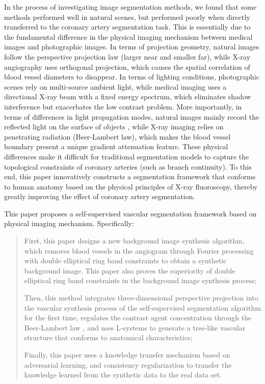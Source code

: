 
In the process of investigating image segmentation methods, we found that some methods \cite{FC.19.IIC}\cite{FC.9.ReDO} performed well in natural scenes, but performed poorly when directly transferred to the coronary artery segmentation task. This is essentially due to the fundamental difference in the physical imaging mechanism between medical images and photographic images. In terms of projection geometry, natural images follow the perspective projection law (larger near and smaller far), while X-ray angiography uses orthogonal projection, which causes the spatial correlation of blood vessel diameters to disappear. In terms of lighting conditions, photographic scenes rely on multi-source ambient light, while medical imaging uses a directional X-ray beam with a fixed energy spectrum, which eliminates shadow interference but exacerbates the low contrast problem. More importantly, in terms of differences in light propagation modes, natural images mainly record the reflected light on the surface of objects \cite{web3d}\cite{web3d.2}, while X-ray imaging relies on penetrating radiation (Beer-Lambert law), which makes the blood vessel boundary present a unique gradient attenuation feature. These physical differences make it difficult for traditional segmentation models to capture the topological constraints of coronary arteries (such as branch continuity). To this end, this paper innovatively constructs a segmentation framework that conforms to human anatomy based on the physical principles of X-ray fluoroscopy, thereby greatly improving the effect of coronary artery segmentation.


This paper proposes a self-supervised vascular segmentation framework based on physical imaging mechanism. Specifically: 
\begin{quotation}
  \noindent
First, this paper designs a new background image synthesis algorithm, which removes blood vessels in the angiogram through Fourier processing with double elliptical ring band constraints to obtain a synthetic background image. This paper also proves the superiority of double elliptical ring band constraints in the background image synthesis process; 

Then, this method integrates three-dimensional perspective projection into the vascular synthesis process of the self-supervised segmentation algorithm for the first time, regulates the contrast agent concentration through the Beer-Lambert law \cite{Beer-Lambert}, and uses L-systems \cite{02.02.L-systems} to generate a tree-like vascular structure that conforms to anatomical characteristics; 

Finally, this paper uses a knowledge transfer mechanism based on adversarial learning, and consistency regularization to transfer the knowledge learned from the synthetic data to the real data set. 
\end{quotation}

